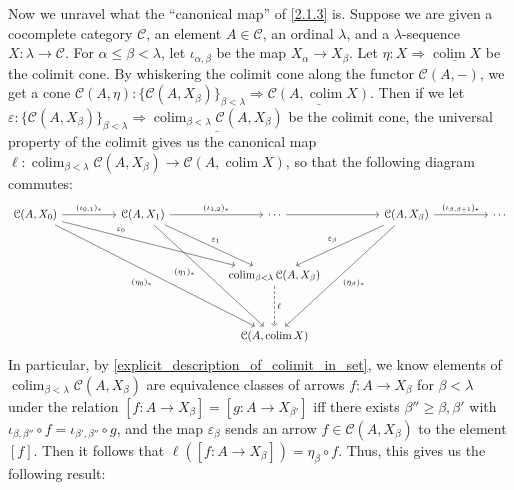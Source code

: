 \documentclass{amsart}
\theoremstyle{plain}
\theoremstyle{definition}
\newcommand{\0}{\mathbf{0}}
\newcommand{\cC}{\mathcal C}
\newcommand{\ul}{\underline}
\newcommand{\vare}{\varepsilon}
\renewcommand{\(}{\left(}
\renewcommand{\)}{\right)}
\DeclareMathOperator*{\colim}{colim}
\begin{document}
Now we unravel what the ``canonical map'' of \autoref{2.1.3} is. Suppose we are given a cocomplete category $\cC$, an element $A\in\cC$, an ordinal $\lambda$, and a $\lambda$-sequence $X:\lambda\to\cC$. For $\alpha\leq\beta<\lambda$, let $\iota_{\alpha,\beta}$ be the map $X_\alpha\to X_\beta$. Let $\eta:X\Rightarrow\ul{\colim X}$ be the colimit cone. By whiskering the colimit cone along the functor $\cC(A,-)$, we get a cone $\cC(A,\eta):\{\cC(A,X_\beta)\}_{\beta<\lambda}\Rightarrow\ul{\cC(A,\colim X)}$. Then if we let $\vare:\{\cC(A,X_\beta)\}_{\beta<\lambda}\Rightarrow\ul{\colim_{\beta<\lambda}\cC(A,X_\beta)}$ be the colimit cone, the universal property of the colimit gives us the canonical map $\ell:\colim_{\beta<\lambda}\cC(A,X_\beta)\to\cC(A,\colim X)$, so that the following diagram commutes:
\[\begin{tikzcd}
  {\cC(A,X_0)} && {\cC(A,X_1)} && \cdots && {\cC(A,X_\beta)} && \cdots \\
  \\
  &&&& {\colim_{\beta<\lambda}\cC(A,X_\beta)} \\
  \\
  &&&& {\cC(A,\colim X)}
  \arrow["{(\iota_{0,1})_*}", from=1-1, to=1-3]
  \arrow["{(\iota_{1,2})_*}", from=1-3, to=1-5]
  \arrow[from=1-5, to=1-7]
  \arrow["{(\iota_{\beta,\beta+1})_*}", from=1-7, to=1-9]
  \arrow["{\vare_\beta}"', from=1-7, to=3-5]
  \arrow["{\vare_1}", from=1-3, to=3-5]
  \arrow["{\vare_0}"{pos=0.3}, from=1-1, to=3-5]
  \arrow["{(\eta_\beta)_*}", from=1-7, to=5-5]
  \arrow["\ell", dashed, from=3-5, to=5-5]
  \arrow["{(\eta_1)_*}"'{pos=0.4}, from=1-3, to=5-5]
  \arrow["{(\eta_0)_*}"', from=1-1, to=5-5]
\end{tikzcd}\]
In particular, by \autoref{explicit_description_of_colimit_in_set}, we know elements of $\colim_{\beta<\lambda}\cC(A,X_\beta)$ are equivalence classes of arrows $f:A\to X_\beta$ for $\beta<\lambda$ under the relation $[f:A\to X_\beta]=[g:A\to X_{\beta'}]$ iff there exists $\beta''\geq\beta,\beta'$ with $\iota_{\beta,\beta''}\circ f=\iota_{\beta',\beta''}\circ g$, and the map $\vare_\beta$ sends an arrow $f\in\cC(A,X_\beta)$ to the element $[f]$. Then it follows that $\ell([f:A\to X_\beta])=\eta_\beta\circ f$. Thus, this gives us the following result:
\end{document}
